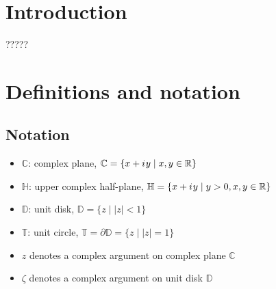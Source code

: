 \documentclass{gCOV2e}
\theoremstyle{plain}%
\theoremstyle{definition}
\theoremstyle{remark}
\newcommand{\iu}{{i\mkern1mu}} %
\newcommand\abs[1]{\left|#1\right|}
\begin{document}
\section{Introduction}

????? 





\section{Definitions and notation}

\subsection{Notation}

\begin{itemize}
\item $\mathbb{C}$: complex plane, $\mathbb{C} = \{ x + \iu y \mid x, y \in \mathbb{R} \}$ 
\item $\mathbb{H}$: upper complex half-plane, $\mathbb{H} = \{ x + \iu y \mid y > 0, x, y \in \mathbb{R} \}$
\item $\mathbb{D}$: unit disk, $\mathbb{D} = \{ z \mid \abs{z} < 1 \}$
\item $\mathbb{T}$: unit circle, $\mathbb{T} = \partial \mathbb{D} =  \{z \mid \abs{z} = 1 \}$
\item $z$ denotes a complex argument on complex plane $\mathbb{C}$
\item $\zeta$ denotes a complex argument on unit disk $\mathbb{D}$
\end{itemize}
\end{document}
